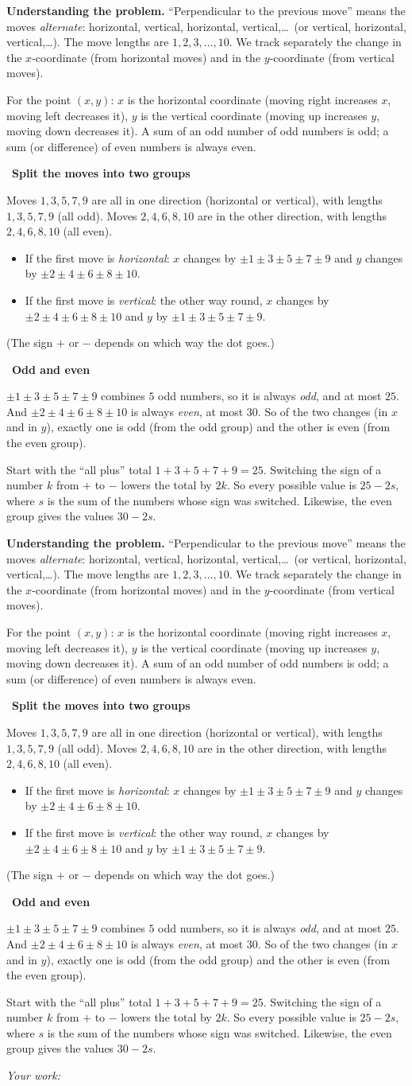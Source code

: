 \documentclass[11pt]{article}
\newif\ifsol \soltrue
\newcommand{\StuProb}[2]{\begin{probboxS}{#1}{#2}\StuProbBody\end{probboxS}}
\newcommand{\probsol}[1]{%
  \begin{lrbox}{\solmeasure}\begin{minipage}{\dimexpr\linewidth-24pt\relax}#1\end{minipage}\end{lrbox}%
  \ifsol
    \begin{solbox}#1\end{solbox}%
  \else
    \setlength{\solht}{\dimexpr\ht\solmeasure+\dp\solmeasure+0.85cm\relax}%
    \ifdim\solht<1.35cm\setlength{\solht}{1.35cm}\fi
    \ifdim\solht>\StudentMaxWork\setlength{\solht}{\StudentMaxWork}\fi
    \par\noindent\begin{minipage}{\linewidth}%
    \expandafter\StuProb\StuProbArgs
    \begin{tcolorbox}[colback=white,colframe=Line,boxrule=0.8pt,arc=5pt,
      left=8pt,right=8pt,top=4pt,bottom=4pt,height=\solht]{\footnotesize\color{Slate}\itshape\WorkWord}\end{tcolorbox}%
    \end{minipage}\par\medskip
  \fi}
\newlength{\StudentMaxWork}\setlength{\StudentMaxWork}{4.5cm}
\newcommand{\step}[2]{\par\smallskip\noindent{\bfseries\color{tmBlue!85!black}\StepWord~#1.}\ {\bfseries #2}\par\nopagebreak}
\def\WorkWord{Your work:}
\def\StepWord{Step}
\begin{document}
\probsol{
\textbf{Understanding the problem.} ``Perpendicular to the previous move'' means the moves \emph{alternate}: horizontal, vertical, horizontal, vertical,\dots\ (or vertical, horizontal, vertical,\dots). The move lengths are $1,2,3,\dots,10$. We track separately the change in the $x$-coordinate (from horizontal moves) and in the $y$-coordinate (from vertical moves).

\begin{recallbox}For the point $(x,y)$: $x$ is the horizontal coordinate (moving right increases $x$, moving left decreases it), $y$ is the vertical coordinate (moving up increases $y$, moving down decreases it). A sum of an odd number of odd numbers is odd; a sum (or difference) of even numbers is always even.\end{recallbox}

\step{1}{Split the moves into two groups}
Moves $1,3,5,7,9$ are all in one direction (horizontal or vertical), with lengths $1,3,5,7,9$ (all odd). Moves $2,4,6,8,10$ are in the other direction, with lengths $2,4,6,8,10$ (all even).
\begin{itemize}[leftmargin=1.4em,itemsep=1pt]
\item If the first move is \emph{horizontal}: $x$ changes by $\pm1\pm3\pm5\pm7\pm9$ and $y$ changes by $\pm2\pm4\pm6\pm8\pm10$.
\item If the first move is \emph{vertical}: the other way round, $x$ changes by $\pm2\pm4\pm6\pm8\pm10$ and $y$ by $\pm1\pm3\pm5\pm7\pm9$.
\end{itemize}
(The sign $+$ or $-$ depends on which way the dot goes.)

\step{2}{Odd and even}
$\pm1\pm3\pm5\pm7\pm9$ combines $5$ odd numbers, so it is always \emph{odd}, and at most $25$. And $\pm2\pm4\pm6\pm8\pm10$ is always \emph{even}, at most $30$. So of the two changes (in $x$ and in $y$), exactly one is odd (from the odd group) and the other is even (from the even group).

\begin{proofbox}Start with the ``all plus'' total $1+3+5+7+9=25$. Switching the sign of a number $k$ from $+$ to $-$ lowers the total by $2k$. So every possible value is $25-2s$, where $s$ is the sum of the numbers whose sign was switched. Likewise, the even group gives the values $30-2s$.\end{proofbox}

}
\end{document}

